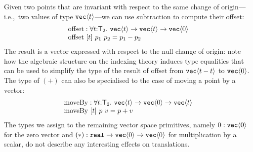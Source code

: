 Given two points that are invariant with respect to the same change of
origin---i.e.,~two values of type $\textup{\texttt{vec}}\langle t \rangle$---we can use
subtraction to compute their offset:
\begin{displaymath}
  \begin{array}{l}
    \mathrm{offset} : \forall t
    \mathord:\mathsf{T}_2.\ \textup{\texttt{vec}}\langle t \rangle \to \textup{\texttt{vec}}\langle t \rangle \to
    \textup{\texttt{vec}}\langle 0 \rangle \\ \mathrm{offset}\ [t]\ p_1\ p_2 = p_1 - p_2
  \end{array}
\end{displaymath}
The result is a vector expressed with respect to the null change of
origin: note how the algebraic structure on the indexing theory
induces type equalities that can be used to simplify the type of the
result of $\mathrm{offset}$ from $\textup{\texttt{vec}}\langle t-t \rangle$ to
$\textup{\texttt{vec}}\langle 0 \rangle$. The type of $(+)$ can also be specialised to the
case of moving a point by a vector:
\begin{displaymath}
  \begin{array}{l}
    \mathrm{moveBy} : \forall t
    \mathord:\mathsf{T}_2.\ \textup{\texttt{vec}}\langle t \rangle \to \textup{\texttt{vec}}\langle 0 \rangle \to
    \textup{\texttt{vec}}\langle t \rangle \\ \mathrm{moveBy}\ [t]\ p\ v = p + v
  \end{array}
\end{displaymath}
The types we assign to the remaining vector space primitives, namely
$\mathrm{0} : \textup{\texttt{vec}}\langle 0 \rangle$ for
the zero vector and $(*) : \textup{\texttt{real}} \to
    \textup{\texttt{vec}}\langle 0 \rangle \to \textup{\texttt{vec}}\langle 0 \rangle$ for
multiplication by a scalar, do not describe any
interesting effects on translations.


